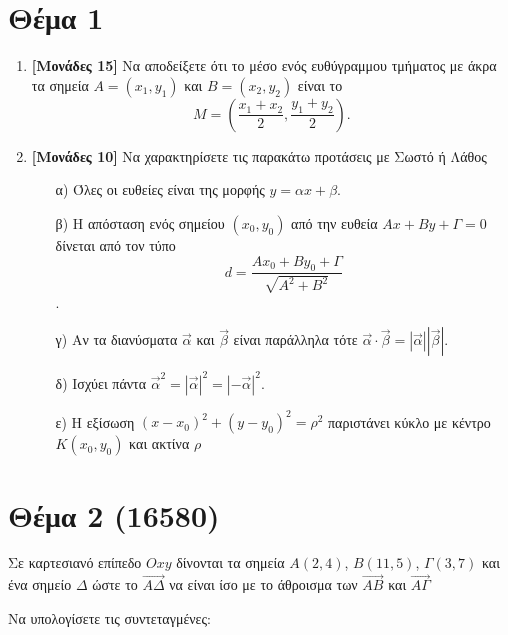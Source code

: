 \documentclass[12pt]{article}
\begin{document}
\section*{Θέμα 1}
\noindent
\begin{enumerate}
 \item \textbf{[Μονάδες 15]} Να αποδείξετε ότι το μέσο ενός ευθύγραμμου τμήματος με άκρα τα σημεία $Α=(x_1,y_1)$ και $Β=(x_2,y_2)$ είναι το
       $$Μ=(\frac{x_1+x_2}{2},\frac{y_1+y_2}{2}) \text{.}$$
 \item \textbf{[Μονάδες 10]} Να χαρακτηρίσετε τις παρακάτω προτάσεις με Σωστό ή Λάθος
       \begin{enumerate}
        \item [α)] Όλες οι ευθείες είναι της μορφής $y=αx+β$.
        \item [β)] Η απόσταση ενός σημείου $(x_0,y_0)$ από την ευθεία $Αx+Βy+Γ=0$ δίνεται από τον τύπο $$d=\frac{Αx_0+Βy_0+Γ}{\sqrt{Α^2+Β^2}}$$.
        \item [γ)] Αν τα διανύσματα $\vec{α}$ και $\vec{β}$ είναι παράλληλα τότε $\vec{α}\cdot\vec{β}=|\vec{α}||\vec{β}|$.
        \item [δ)] Ισχύει πάντα $\vec{α}^2=|\vec{α}|^2=|-\vec{α}|^2$.
        \item [ε)] Η εξίσωση $(x-x_0)^2+(y-y_0)^2=ρ^2$ παριστάνει κύκλο με κέντρο $Κ(x_0,y_0)$ και ακτίνα $ρ$
       \end{enumerate}
\end{enumerate}

\section*{Θέμα 2 (16580)}
\noindent
Σε καρτεσιανό επίπεδο $Οxy$ δίνονται τα σημεία $Α(2,4)$, $Β(11,5)$, $Γ(3,7)$ και ένα σημείο $Δ$ ώστε το $\overrightarrow{ΑΔ}$ να είναι ίσο με το άθροισμα των $\overrightarrow{ΑΒ}$ και $\overrightarrow{ΑΓ}$

Να υπολογίσετε τις συντεταγμένες:
\end{document}
